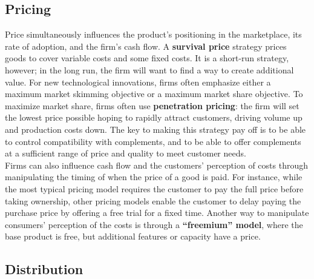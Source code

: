 \documentclass[12pt]{article}
\begin{document}
\subsection{Pricing}
Price simultaneously influences the product's positioning in the marketplace, its rate of adoption, and the firm's cash flow.
A \textbf{survival price} strategy prices goods to cover variable costs and some fixed
costs. It is a short-run strategy, however; in the long run, the firm will want to find a way
to create additional value. For new technological innovations, firms often emphasize either a maximum market
skimming objective or a maximum market share objective.
To maximize market share, firms often use \textbf{penetration pricing}: the firm will set the lowest price possible hoping to rapidly attract customers,
driving volume up and production costs down. The key to making this strategy pay off is to be able to control compatibility with complements, and to be able to offer
complements at a sufficient range of price and quality to meet customer needs. \\
Firms can also influence cash flow and the customers' perception of costs through
manipulating the timing of when the price of a good is paid. For instance, while the
most typical pricing model requires the customer to pay the full price before taking
ownership, other pricing models enable the customer to delay paying the purchase
price by offering a free trial for a fixed time.
Another way to manipulate consumers' perception of the costs is through a
\textbf{“freemium” model}, where the base product is free, but additional features or capacity
have a price. 

\subsection{Distribution}
\end{document}
